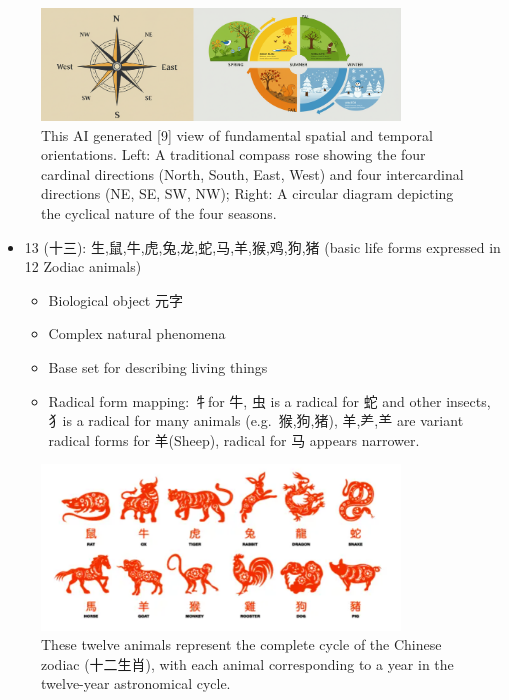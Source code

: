 \documentclass[11pt,letterpaper]{article}
\begin{document}
\begin{figure}
\centering
\includegraphics[width=0.85\textwidth]{./images/8-directions-seasons.png}
\caption{This AI generated {[}9{]} view of fundamental spatial and
temporal orientations. Left: A traditional compass rose showing the four
cardinal directions (North, South, East, West) and four intercardinal
directions (NE, SE, SW, NW); Right: A circular diagram depicting the
cyclical nature of the four seasons.}
\end{figure}

\begin{itemize}
\tightlist
\item
  13 (十三): 生,鼠,牛,虎,兔,龙,蛇,马,羊,猴,鸡,狗,猪 (basic life forms
  expressed in 12 Zodiac animals)

  \begin{itemize}
  \tightlist
  \item
    Biological object 元字
  \item
    Complex natural phenomena
  \item
    Base set for describing living things
  \item
    Radical form mapping: 牜for 牛, 虫 is a radical for 蛇 and other
    insects, 犭is a radical for many animals (e.g.~猴,狗,猪), 羊,⺶,⺷
    are variant radical forms for 羊(Sheep), radical for 马 appears
    narrower.
  \end{itemize}
\end{itemize}

\begin{figure}
\centering
\includegraphics[width=0.85\textwidth]{./images/12-zodiac-animals.png}
\caption{These twelve animals represent the complete cycle of the
Chinese zodiac (十二生肖), with each animal corresponding to a year in
the twelve-year astronomical cycle.}
\end{figure}
\end{document}
